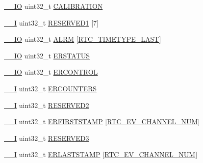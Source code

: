 \begin{DoxyCompactItemize}
\item 
\hyperlink{core__sc300_8h_aec43007d9998a0a0e01faede4133d6be}{\+\_\+\+\_\+\+IO} uint32\+\_\+t \hyperlink{struct_l_p_c___r_t_c___t_abe224f8608ae3d2c5b1036bf943b6c27}{C\+A\+L\+I\+B\+R\+A\+T\+I\+ON}
\item 
\hyperlink{core__sc300_8h_af63697ed9952cc71e1225efe205f6cd3}{\+\_\+\+\_\+I} uint32\+\_\+t \hyperlink{struct_l_p_c___r_t_c___t_ac8d353815b3178e63a219337563f402a}{R\+E\+S\+E\+R\+V\+E\+D1} \mbox{[}7\mbox{]}
\item 
\hyperlink{core__sc300_8h_aec43007d9998a0a0e01faede4133d6be}{\+\_\+\+\_\+\+IO} uint32\+\_\+t \hyperlink{struct_l_p_c___r_t_c___t_afcdefcb9e99cb1459b51885e6754a247}{A\+L\+RM} \mbox{[}\hyperlink{group___r_t_c__18_x_x__43_x_x_gga8144898fe628404d396db06dc8aac0e0a0d4fafef57b6ef363f9a0875ff339cad}{R\+T\+C\+\_\+\+T\+I\+M\+E\+T\+Y\+P\+E\+\_\+\+L\+A\+ST}\mbox{]}
\item 
\hyperlink{core__sc300_8h_aec43007d9998a0a0e01faede4133d6be}{\+\_\+\+\_\+\+IO} uint32\+\_\+t \hyperlink{struct_l_p_c___r_t_c___t_a55a9999297cb6999d95700eb37d383d7}{E\+R\+S\+T\+A\+T\+US}
\item 
\hyperlink{core__sc300_8h_aec43007d9998a0a0e01faede4133d6be}{\+\_\+\+\_\+\+IO} uint32\+\_\+t \hyperlink{struct_l_p_c___r_t_c___t_a34bc46b28dbcccf7d64b7c71344bf8fd}{E\+R\+C\+O\+N\+T\+R\+OL}
\item 
\hyperlink{core__sc300_8h_af63697ed9952cc71e1225efe205f6cd3}{\+\_\+\+\_\+I} uint32\+\_\+t \hyperlink{struct_l_p_c___r_t_c___t_aa5488dd2a91cca6ea4ac2dc1aa226076}{E\+R\+C\+O\+U\+N\+T\+E\+RS}
\item 
\hyperlink{core__sc300_8h_af63697ed9952cc71e1225efe205f6cd3}{\+\_\+\+\_\+I} uint32\+\_\+t \hyperlink{struct_l_p_c___r_t_c___t_a13d8c36a296a876371d8e463cfce0bc5}{R\+E\+S\+E\+R\+V\+E\+D2}
\item 
\hyperlink{core__sc300_8h_af63697ed9952cc71e1225efe205f6cd3}{\+\_\+\+\_\+I} uint32\+\_\+t \hyperlink{struct_l_p_c___r_t_c___t_aaedde7df38ce938df374f992e58baf7d}{E\+R\+F\+I\+R\+S\+T\+S\+T\+A\+MP} \mbox{[}\hyperlink{group___r_t_c__18_x_x__43_x_x_ggaac7e8d7c66860037449fdde1bdfb657bae56aa8110b05663f96d666d4ce378c85}{R\+T\+C\+\_\+\+E\+V\+\_\+\+C\+H\+A\+N\+N\+E\+L\+\_\+\+N\+UM}\mbox{]}
\item 
\hyperlink{core__sc300_8h_af63697ed9952cc71e1225efe205f6cd3}{\+\_\+\+\_\+I} uint32\+\_\+t \hyperlink{struct_l_p_c___r_t_c___t_a0dccf23b0301eb78ab61f90a3e6ae594}{R\+E\+S\+E\+R\+V\+E\+D3}
\item 
\hyperlink{core__sc300_8h_af63697ed9952cc71e1225efe205f6cd3}{\+\_\+\+\_\+I} uint32\+\_\+t \hyperlink{struct_l_p_c___r_t_c___t_a1657c3a94cbbf1c7ecaa11f5ae2cfcc9}{E\+R\+L\+A\+S\+T\+S\+T\+A\+MP} \mbox{[}\hyperlink{group___r_t_c__18_x_x__43_x_x_ggaac7e8d7c66860037449fdde1bdfb657bae56aa8110b05663f96d666d4ce378c85}{R\+T\+C\+\_\+\+E\+V\+\_\+\+C\+H\+A\+N\+N\+E\+L\+\_\+\+N\+UM}\mbox{]}
\end{DoxyCompactItemize}


